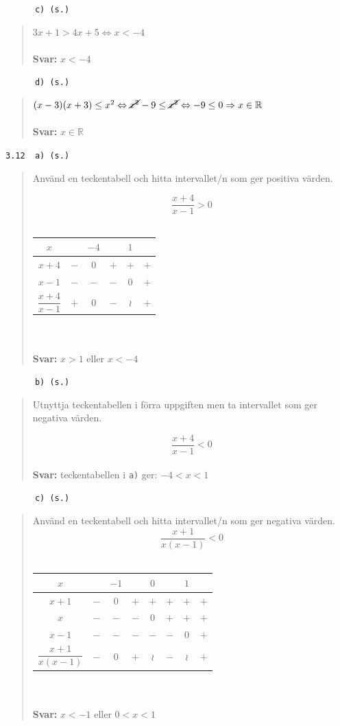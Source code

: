 \documentclass[a4paper]{article}
\newcommand{\tskcol}[1]{\textcolor{tskcol}{#1}}
\begin{document}
	\texttt{\tskcol{~~~~~~c) (s.)}}
	\begin{quotation}
		\noindent
		$3x+1>4x+5 \Leftrightarrow
		x<-4$
		\\ \\
		\textbf{Svar:} $x<-4$
	\end{quotation}
	
	\texttt{\tskcol{~~~~~~d) (s.)}}
	\begin{quotation}
		\noindent
		$(x-3)(x+3)\le x^2 \Leftrightarrow
		\cancel{x^2}-9 \le \cancel{x^2} \Leftrightarrow
		-9 \le 0 \Rightarrow x\in\mathbb{R}$
		\\ \\
		\textbf{Svar:} $x\in\mathbb{R}$
	\end{quotation}
	
	\pagebreak
	\texttt{\tskcol{3.12~~a) (s.)}}
	\begin{quotation}
		\noindent
		Använd en teckentabell och hitta intervallet/n som ger positiva värden.
		
		 \[\dfrac{x+4}{x-1}>0\] \\
		\begin{tabular}{c|c|c|c|c|c}
			$x$ & & $-4$ & & $1$ & \\ \hline
			$x+4$              & $-$ & $0$ & $+$ & $+$ & $+$ \\
			$x-1$              & $-$ & $-$ & $-$ & $0$ & $+$ \\ \hline
			$\dfrac{x+4}{x-1}$ & $+$ & $0$ & $-$ &$\wr$& $+$ 
		\end{tabular} \\ \\
		\textbf{Svar:} $x>1$ eller $x<-4$
	\end{quotation}
	
	\texttt{\tskcol{~~~~~~b) (s.)}}
	\begin{quotation}
		\noindent
		Utnyttja teckentabellen i förra uppgiften men ta intervallet som ger negativa värden.
		
		\[\dfrac{x+4}{x-1}<0\]
		\\
		\textbf{Svar:} teckentabellen i \texttt{\tskcol{a)}} ger: $-4<x<1$
	\end{quotation}
	
	\texttt{\tskcol{~~~~~~c) (s.)}}
	\begin{quotation}
		\noindent
		Använd en teckentabell och hitta intervallet/n som ger negativa värden.
		\[\dfrac{x+1}{x(x-1)}<0\] \\
		\begin{tabular}{c|c|c|c|c|c|c|c}
			$x$ & & $-1$ & & $0$ & & $1$ & \\ \hline
			$x+1$                  & $-$ & $0$ & $+$ & $+$ & $+$ & $+$ & $+$ \\
			$x$                    & $-$ & $-$ & $-$ & $0$ & $+$ & $+$ & $+$ \\
			$x-1$                  & $-$ & $-$ & $-$ & $-$ & $-$ & $0$ & $+$ \\ \hline
			$\dfrac{x+1}{x(x-1)}$  & $-$ & $0$ & $+$ &$\wr$& $-$ &$\wr$& $+$ \\
		\end{tabular}
		\\ \\
		\textbf{Svar:} $x<-1$ eller $0<x<1$
	\end{quotation}
	
\end{document}
